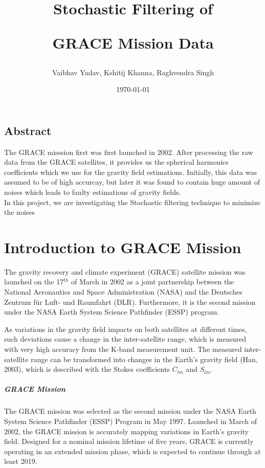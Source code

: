 \documentclass[a4paper,12pt]{report}
\title{\centerline{Stochastic Filtering of} \centerline{GRACE Mission Data}}
\author{Vaibhav Yadav, Kshitij Khanna, Raghvendra Singh}
\date{\today}
\begin{document}
\maketitle


\section{Abstract}
The GRACE misssion first was first launched in 2002. After processing the raw data from the GRACE satellites, it provides us the spherical harmonics coefficients which we use for the gravity field estimations. Initially, this data was assumed to be of high accurcay, but later it was found to contain huge amount of noises which leads to faulty estimations of gravity fields.\\
In this project, we are investigating the Stochastic filtering technique to minimize the noises   


\newpage
\chapter{Introduction to GRACE Mission}
 The gravity recovery and climate experiment (GRACE) satellite mission was launched
on the 17$^{th}$ of March in 2002 as a joint partnership between the National Aeronautics
and Space Administration (NASA) and the Deutsches Zentrum für Luft- und Raumfahrt
(DLR). Furthermore, it is the second mission under the NASA Earth System Science
Pathfinder (ESSP) program.

As variations in the gravity field impacts on both satellites at different times, such
deviations cause a change in the inter-satellite range, which is measured with very high
accuracy from the K-band measurement unit. The measured inter-satellite range can
be transformed into changes in the Earth’s gravity field (Han, 2003), which is described
with the Stokes coefficients $C_{lm}$ and $S_{lm}$.


\paragraph{GRACE Mission} 
The GRACE mission was selected as the second mission under the NASA Earth System Science Pathfinder (ESSP) Program in May 1997. Launched in March of 2002, the GRACE mission is accurately mapping variations in Earth's gravity field. Designed for a nominal mission lifetime of five years, GRACE is currently operating in an extended mission phase, which is expected to continue through at least 2019.
\end{document}
